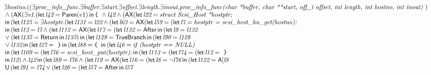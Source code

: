 \documentclass{article}
\newcommand{\U}{\,\mbox{\sf{U}}\,}
\newcommand{\A}{\mbox{\sf{A}}}
\newcommand{\AX}{\mbox{\sf{AX}}}
\newcommand{\mita}[1]{\mbox{\it{{#1}}}}
\newcommand{\msf}[1]{\mbox{\sf{{#1}}}}
\newcommand{\ttlb}{\mbox{\tt \char'173}}
\newcommand{\ttrb}{\mbox{\tt \char'175}}
\begin{document}
\[\begin{array}{l}
\exists \mita{hostno} . ((\exists \mita{proc\_info\_func} . \exists \mita{buffer} . \exists \mita{start} . \exists \mita{offset} . \exists \mita{length} . \exists \mita{inout} . \mita{proc\_info\_func(char *buffer, char **start, off\_t offset, int length,
               int hostno, int inout) })\\\mbox{} \wedge (\AX(\exists \mita{v1} . (\mita{\sf{let}} \, \mita{l42} = \msf{Paren}(v1) \, \mita{\sf{in}} \, \mita{{\ttlb}
  } \wedge \mita{l42} \wedge (\AX(\mita{\sf{let}} \, \mita{l22} = \mita{struct Scsi\_Host *hostptr;}\\\mbox{} \, \mita{\sf{in}} \, (\mita{\sf{let}} \, \mita{l125} = \exists \mita{hostptr} . (\mita{\sf{let}} \, \mita{l131} = \mita{l22} \wedge (\mita{\sf{let}} \, \mita{l63} = \AX(\mita{\sf{let}} \, \mita{l59} = (\mita{\sf{let}} \, \mita{l7} = \mita{hostptr = scsi\_host\_hn\_get(hostno);}\\\mbox{} \, \mita{\sf{in}} \, (\mita{\sf{let}} \, \mita{l13} = \mita{l7} \wedge (\mita{\sf{let}} \, \mita{l112} = \AX(\mita{\sf{let}} \, \mita{l17} = (\mita{\sf{let}} \, \mita{l132} = \msf{After} \, \mita{\sf{in}} \, (\mita{\sf{let}} \, \mita{l9} = \mita{l132}\\\mbox{} \vee (\mita{\sf{let}} \, \mita{l135} = \msf{Return} \, \mita{\sf{in}} \, \mita{l135}
) \, \mita{\sf{in}} \, (\mita{\sf{let}} \, \mita{l128} = \msf{TrueBranch} \, \mita{\sf{in}} \, (\mita{\sf{let}} \, \mita{l90} = \mita{l128}\\\mbox{} \vee \mita{l132} \, \mita{\sf{in}} \, (\mita{\sf{let}} \, \mita{l27} = \mita{
{\ttrb}} \, \mita{\sf{in}} \, (\mita{\sf{let}} \, \mita{l88} = \mita{{\ttlb}
  } \, \mita{\sf{in}} \, (\mita{\sf{let}} \, \mita{l46} = \mita{if (hostptr == NULL) }\\\mbox{} \, \mita{\sf{in}} \, (\mita{\sf{let}} \, \mita{l109} = (\mita{\sf{let}} \, \mita{l76} = \mita{scsi\_host\_put(hostptr);} \, \mita{\sf{in}} \, (\mita{\sf{let}} \, \mita{l113} = (\mita{\sf{let}} \, \mita{l74} = (\mita{\sf{let}} \, \mita{l12} = \mita{
{\ttrb}}\\\mbox{} \, \mita{\sf{in}} \, \mita{l12}
) \wedge \mita{l42} \, \mita{\sf{in}} \, (\mita{\sf{let}} \, \mita{l89} = \mita{l76} \wedge (\mita{\sf{let}} \, \mita{l19} = \AX(\mita{\sf{let}} \, \mita{l16} = (\mita{\sf{let}} \, \mita{l8} = \neg \mita{l76} \, \mita{\sf{in}} \, (\mita{\sf{let}} \, \mita{l122} = \A[\mita{l8}\\\mbox{} \U (\mita{\sf{let}} \, \mita{l91} = \mita{l74} \vee (\mita{\sf{let}} \, \mita{l26} = (\mita{\sf{let}} \, \mita{l57} = \msf{After} \, \mita{\sf{in}} \, \mita{l57}

\end{array}\]
\end{document}
